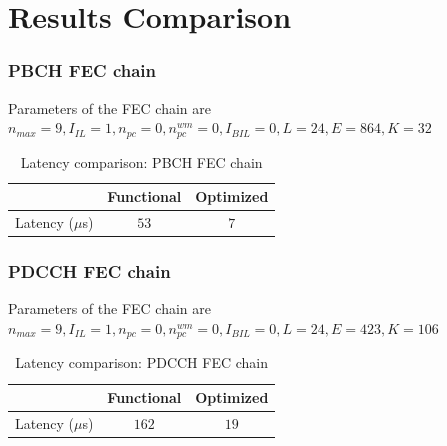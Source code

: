 \section{Results Comparison}

\subsubsection{PBCH FEC chain}
Parameters of the FEC chain are \newline
$n_{max} = 9, I_{IL} = 1, n_{pc} = 0, n_{pc}^{wm} = 0, I_{BIL} = 0, L = 24, E = 864, K = 32$
\begin{table}[!h]
	\begin{center}
		\caption{Latency comparison: PBCH FEC chain}
		\label{tab:pbchFecChain}
		\begin{tabular}{c|c|c} %
			\textbf{ } & Functional & Optimized \\
			\hline
			Latency ($\mu$s) & $53$ & $7$\\
		\end{tabular}
	\end{center}
\end{table}

\subsubsection{PDCCH FEC chain} 
Parameters of the FEC chain are \newline
$n_{max} = 9, I_{IL} = 1, n_{pc} = 0, n_{pc}^{wm} = 0, I_{BIL} = 0, L = 24, E = 423, K = 106$ 
\begin{table}[!h]
	\begin{center}
		\caption{Latency comparison: PDCCH FEC chain}
		\label{tab:pdcchFecChain}
		\begin{tabular}{c|c|c} %
			\textbf{ } & Functional & Optimized \\
			\hline
			Latency ($\mu$s) & $162$ & $19$\\
		\end{tabular}
	\end{center}
\end{table}


